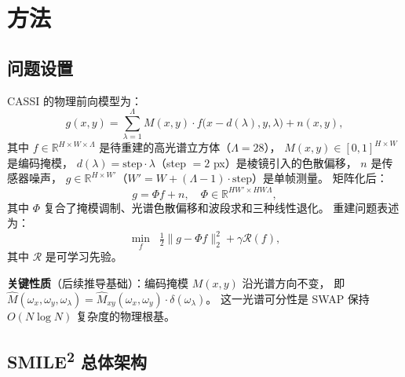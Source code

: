 \documentclass[a4paper,11pt,twocolumn]{ctexart}
\newcommand{\smiletwo}{SMILE\textsuperscript{2}}
\newcommand{\swap}{\textsc{SWAP}}
\begin{document}
\section{方法}\label{sec:method}

\subsection{问题设置}\label{sec:problem}

CASSI 的物理前向模型为：
\begin{equation}
g(x,y) = \sum_{\lambda=1}^{\Lambda} M(x,y) \cdot f\!\big(x - d(\lambda), y, \lambda\big) + n(x,y),
\label{eq:forward}
\end{equation}
其中 $f \in \mathbb{R}^{H \times W \times \Lambda}$ 是待重建的高光谱立方体（$\Lambda=28$），
$M(x,y) \in [0,1]^{H \times W}$ 是编码掩模，
$d(\lambda) = \text{step} \cdot \lambda$（step $= 2$ px）是棱镜引入的色散偏移，
$n$ 是传感器噪声，
$g \in \mathbb{R}^{H \times W'}$（$W' = W + (\Lambda-1) \cdot \text{step}$）是单帧测量。
矩阵化后：
\begin{equation}
g = \Phi f + n, \quad \Phi \in \mathbb{R}^{HW' \times HW\Lambda},
\label{eq:forward_matrix}
\end{equation}
其中 $\Phi$ 复合了掩模调制、光谱色散偏移和波段求和三种线性退化。
重建问题表述为：
\begin{equation}
\min_{f} \;\; \tfrac{1}{2}\|g - \Phi f\|_2^2 + \gamma \mathcal{R}(f),
\label{eq:inverse}
\end{equation}
其中 $\mathcal{R}$ 是可学习先验。

\textbf{关键性质}（后续推导基础）：编码掩模 $M(x,y)$ 沿光谱方向不变，
即 $\hat{M}(\omega_x, \omega_y, \omega_\lambda) = \hat{M}_{xy}(\omega_x, \omega_y) \cdot \delta(\omega_\lambda)$。
这一光谱可分性是 \swap{} 保持 $O(N\log N)$ 复杂度的物理根基。


\subsection{\smiletwo{} 总体架构}\label{sec:overview}
\end{document}
